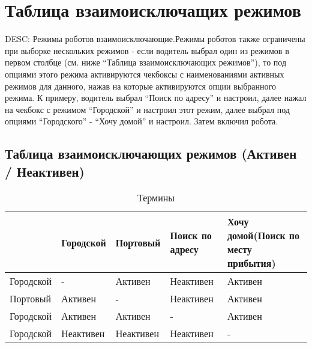 \section{Таблица взаимоисключащих режимов}

	DESC: Режимы роботов взаимоисключающие.Режимы роботов также ограничены при выборке нескольких режимов - если водитель выбрал один из режимов в первом столбце (см. ниже “Таблица взаимоисключающих режимов”), то под опциями этого режима активируются чекбоксы с наименованиями активных режимов для данного, нажав на которые активируются опции выбранного режима. К примеру, водитель выбрал “Поиск по адресу” и настроил, далее нажал на чекбокс с режимом “Городской” и настроил этот режим, далее выбрал под опциями “Городского” - “Хочу домой” и настроил. Затем включил робота.

	\subsection{Таблица взаимоисключающих режимов (Активен / Неактивен)}

		\begin{table}[htb]
	        \begin{center}
	        \caption{Термины}
	        \label{appendices_termins}
	        \setlength{\extrarowheight}{2mm}
	        \begin{tabular}{|p{3cm}|p{2cm}|p{2cm}|p{2cm}|p{3cm}|}
	           \hline   \textbf{}&\textbf{Городской}&\textbf{Портовый}&\textbf{Поиск по адресу}&\textbf{Хочу домой(Поиск по месту прибытия)} \\ [2mm]


	           \hline Городской & - & Активен & Неактивен & Активен\\ [2mm]

	           \hline Портовый & Активен & - & Неактивен & Активен\\ [2mm]

	           \hline Городской & Активен & Активен & - & Активен\\ [2mm]

	           \hline Городской & Неактивен & Неактивен & Неактивен & -\\ [2mm]    

	           \hline
	        \end{tabular}
	        \end{center}
      	\end{table}